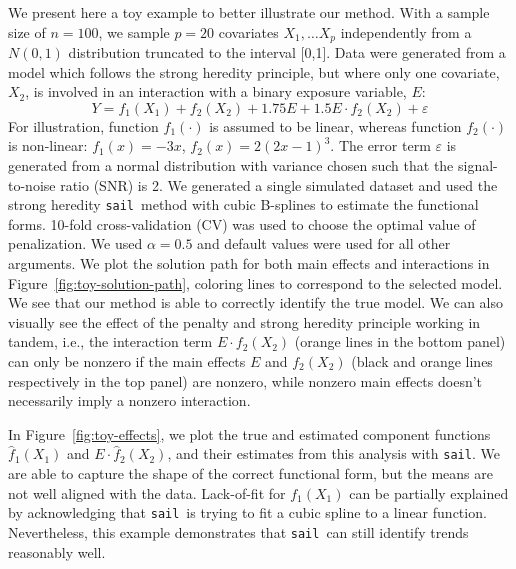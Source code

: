 \documentclass[12pt,letter]{article}\usepackage[]{graphicx}\usepackage[]{color}
\newcommand{\sail}{\texttt{sail}}
\begin{document}
We present here a toy example to better illustrate our method. With a sample size of $n=100$, we sample $p=20$ covariates $X_1, \ldots X_p$ independently from a $N(0,1)$ distribution truncated to the interval [0,1]. Data were generated from a model which follows the strong heredity principle, but where only one covariate, $X_2$, is involved in an interaction with a binary exposure variable, $E$:
\begin{equation}
	Y = f_1(X_1) + f_2(X_2) + 1.75 E + 1.5 E \cdot f_2(X_2) + \varepsilon
\end{equation}
For illustration, function $f_1(\cdot)$ is assumed to be linear, whereas function $f_2(\cdot)$ is non-linear: $f_1(x) = -3x$, $f_2(x) = 2(2x-1)^3$. The error term $\varepsilon$ is generated from a normal distribution with variance chosen such that the signal-to-noise ratio (SNR) is 2.  We generated a single simulated dataset and used the strong heredity \sail ~method with cubic B-splines to estimate the functional forms. 10-fold cross-validation (CV) was used to choose the optimal value of penalization. We used $\alpha=0.5$ and default values were used for all other arguments. We plot the solution path for both main effects and interactions in Figure~\ref{fig:toy-solution-path}, coloring lines to correspond to the selected model. We see that our method is able to correctly identify the true model. We can also visually see the effect of the penalty and strong heredity principle working in tandem, i.e., the interaction term $E \cdot f_2(X_2)$ (orange lines in the bottom panel) can only be nonzero if the main effects $E$ and $f_2(X_2)$ (black and orange lines respectively in the top panel) are nonzero, while nonzero main effects doesn't necessarily imply a nonzero interaction. 





In Figure~\ref{fig:toy-effects}, we plot the true and estimated component functions $\hat{f}_1(X_1)$ and $E \cdot \hat{f}_2(X_2)$, and their estimates from this analysis with \texttt{sail}. We are able to capture the shape of the correct functional form, but the means are not well aligned with the data. Lack-of-fit for $f_1(X_1)$ can be partially explained by acknowledging that \sail ~is trying to fit a cubic spline to a linear function. Nevertheless, this example demonstrates that \sail ~can still identify trends reasonably well. 
\end{document}
